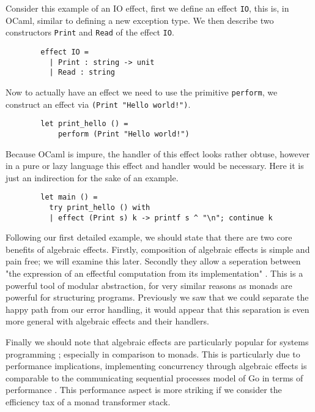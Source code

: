 \begin{example}
    Consider this example of an IO effect,
    first we define an effect \texttt{IO},
    this is, in OCaml, similar to defining
    a new exception type.
    We then describe two constructors
    \texttt{Print} and \texttt{Read}
    of the effect \texttt{IO}.
    \begin{verbatim}
        effect IO =
          | Print : string -> unit
          | Read : string\end{verbatim}
    Now to actually have an effect we need to use the primitive \texttt{perform},
    we construct an effect via \texttt{(Print "Hello world!")}.
    \begin{verbatim}
        let print_hello () =
            perform (Print "Hello world!")\end{verbatim}
    Because OCaml is impure, the handler of this effect looks rather obtuse,
    however in a pure or lazy language this effect and handler would be necessary.
    Here it is just an indirection for the sake of an example.
    \begin{verbatim}
        let main () =
          try print_hello () with
          | effect (Print s) k -> printf s ^ "\n"; continue k\end{verbatim}
\end{example}

Following our first detailed example,
we should state that there are two core benefits of algebraic effects.
Firstly, composition of algebraic effects is simple and pain free;
we will examine this later.
Secondly they allow a seperation between
"the expression of an effectful computation from its implementation"
\cite{dolan2015effective}.
This is a powerful tool of modular abstraction,
for very similar reasons as monads are powerful
for structuring programs.
Previously we saw that we could separate the happy path from our error handling,
it would appear that this separation is even more general with algebraic effects
and their handlers.

Finally we should note that
algebraic effects are particularly popular for systems programming
\cite{dolan2015effective, dolan2017concurrent, dolaneffectively};
especially in comparison to monads.
This is particularly due to performance implications,
implementing concurrency through algebraic effects
is comparable to the communicating sequential processes model
of Go in terms of performance \cite{Dolan:2017}.
This performance aspect is more striking
if we consider the efficiency tax of a monad
transformer stack\cite{o2008real}.

